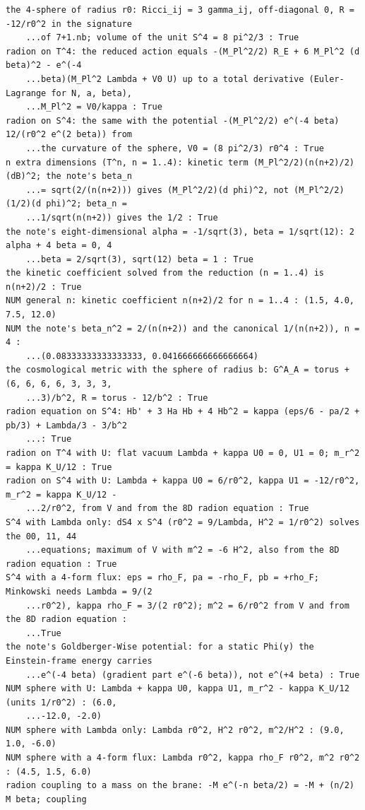 \documentclass[10pt,a4paper]{article}
\begin{document}
\begin{Verbatim}[fontsize=\small,frame=single,framesep=2mm]
the 4-sphere of radius r0: Ricci_ij = 3 gamma_ij, off-diagonal 0, R = -12/r0^2 in the signature
    ...of 7+1.nb; volume of the unit S^4 = 8 pi^2/3 : True
radion on T^4: the reduced action equals -(M_Pl^2/2) R_E + 6 M_Pl^2 (d beta)^2 - e^(-4
    ...beta)(M_Pl^2 Lambda + V0 U) up to a total derivative (Euler-Lagrange for N, a, beta),
    ...M_Pl^2 = V0/kappa : True
radion on S^4: the same with the potential -(M_Pl^2/2) e^(-4 beta) 12/(r0^2 e^(2 beta)) from
    ...the curvature of the sphere, V0 = (8 pi^2/3) r0^4 : True
n extra dimensions (T^n, n = 1..4): kinetic term (M_Pl^2/2)(n(n+2)/2)(dB)^2; the note's beta_n
    ...= sqrt(2/(n(n+2))) gives (M_Pl^2/2)(d phi)^2, not (M_Pl^2/2)(1/2)(d phi)^2; beta_n =
    ...1/sqrt(n(n+2)) gives the 1/2 : True
the note's eight-dimensional alpha = -1/sqrt(3), beta = 1/sqrt(12): 2 alpha + 4 beta = 0, 4
    ...beta = 2/sqrt(3), sqrt(12) beta = 1 : True
the kinetic coefficient solved from the reduction (n = 1..4) is n(n+2)/2 : True
NUM general n: kinetic coefficient n(n+2)/2 for n = 1..4 : (1.5, 4.0, 7.5, 12.0)
NUM the note's beta_n^2 = 2/(n(n+2)) and the canonical 1/(n(n+2)), n = 4 :
    ...(0.08333333333333333, 0.041666666666666664)
the cosmological metric with the sphere of radius b: G^A_A = torus + (6, 6, 6, 6, 3, 3, 3,
    ...3)/b^2, R = torus - 12/b^2 : True
radion equation on S^4: Hb' + 3 Ha Hb + 4 Hb^2 = kappa (eps/6 - pa/2 + pb/3) + Lambda/3 - 3/b^2
    ...: True
radion on T^4 with U: flat vacuum Lambda + kappa U0 = 0, U1 = 0; m_r^2 = kappa K_U/12 : True
radion on S^4 with U: Lambda + kappa U0 = 6/r0^2, kappa U1 = -12/r0^2, m_r^2 = kappa K_U/12 -
    ...2/r0^2, from V and from the 8D radion equation : True
S^4 with Lambda only: dS4 x S^4 (r0^2 = 9/Lambda, H^2 = 1/r0^2) solves the 00, 11, 44
    ...equations; maximum of V with m^2 = -6 H^2, also from the 8D radion equation : True
S^4 with a 4-form flux: eps = rho_F, pa = -rho_F, pb = +rho_F; Minkowski needs Lambda = 9/(2
    ...r0^2), kappa rho_F = 3/(2 r0^2); m^2 = 6/r0^2 from V and from the 8D radion equation :
    ...True
the note's Goldberger-Wise potential: for a static Phi(y) the Einstein-frame energy carries
    ...e^(-4 beta) (gradient part e^(-6 beta)), not e^(+4 beta) : True
NUM sphere with U: Lambda + kappa U0, kappa U1, m_r^2 - kappa K_U/12 (units 1/r0^2) : (6.0,
    ...-12.0, -2.0)
NUM sphere with Lambda only: Lambda r0^2, H^2 r0^2, m^2/H^2 : (9.0, 1.0, -6.0)
NUM sphere with a 4-form flux: Lambda r0^2, kappa rho_F r0^2, m^2 r0^2 : (4.5, 1.5, 6.0)
radion coupling to a mass on the brane: -M e^(-n beta/2) = -M + (n/2) M beta; coupling

\end{Verbatim}
\end{document}
